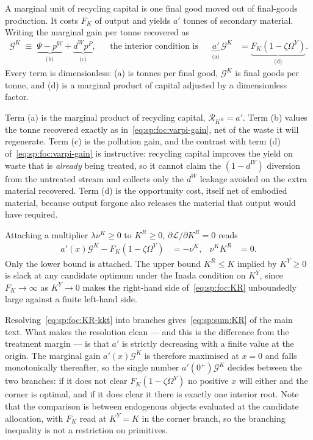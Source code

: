  A marginal unit of recycling capital is one final good moved out of final-goods production. It costs $F_K$ of output and yields $a'$ tonnes of secondary material. Writing the marginal gain per tonne recovered as
\begin{align}
\mathcal G^K \;\equiv\; \underbrace{\Psi-p^W}_{\text{(b)}}+\underbrace{d^Wp^P}_{\text{(c)}},
&&\text{the interior condition is}
&&
\underbrace{a'}_{\text{(a)}}\,\mathcal G^K &= \underbrace{F_K\left(1-\zeta\Omega^Y\right)}_{\text{(d)}} .
\label{eq:sp:foc:KR}
\end{align}
Every term is dimensionless: (a) is tonnes per final good, $\mathcal G^K$ is final goods per tonne, and (d) is a marginal product of capital adjusted by a dimensionless factor.

Term (a) is the marginal product of recycling capital, $\mathcal R_{K^R}=a'$. Term (b) values the tonne recovered exactly as in~\eqref{eq:sp:foc:varpi-gain}, net of the waste it will regenerate. Term (c) is the pollution gain, and the contrast with term (d) of~\eqref{eq:sp:foc:varpi-gain} is instructive: recycling capital improves the yield on waste that is \emph{already} being treated, so it cannot claim the $\left(1-d^W\right)$ diversion from the untreated stream and collects only the $d^W$ leakage avoided on the extra material recovered. Term (d) is the opportunity cost, itself net of embodied material, because output forgone also releases the material that output would have required.

 Attaching a multiplier $\lambda\nu^K\ge0$ to $K^R\ge0$,
$\partial\mathcal L/\partial K^R=0$ reads
\begin{align}
a'\!\left(x\right)\mathcal G^K-F_K\left(1-\zeta\Omega^Y\right) &= -\nu^K,
&
\nu^KK^R &= 0 .
\label{eq:sp:foc:KR-kkt}
\end{align}
Only the lower bound is attached. The upper bound $K^R\le K$ implied by $K^Y\ge0$ is
slack at any candidate optimum under the Inada condition on $K^Y$, since $F_K\to\infty$ as
$K^Y\to0$ makes the right-hand side of~\eqref{eq:sp:foc:KR} unboundedly large against a finite left-hand
side.

Resolving~\eqref{eq:sp:foc:KR-kkt} into branches gives~\eqref{eq:sp:sum:KR} of the main text. What
makes the resolution clean --- and this is the difference from the treatment margin --- is that
$a'$ is strictly decreasing with a finite value at the origin. The marginal gain
$a'\!\left(x\right)\mathcal G^K$ is therefore maximised at $x=0$ and falls monotonically thereafter,
so the single number $a'\!\left(0^+\right)\mathcal G^K$ decides between the two branches: if it does
not clear $F_K\left(1-\zeta\Omega^Y\right)$ no positive $x$ will either and the corner is optimal,
and if it does clear it there is exactly one interior root. Note that the comparison is between
endogenous objects evaluated at the candidate allocation, with $F_K$ read at $K^Y=K$ in the corner
branch, so the branching inequality is not a restriction on primitives.

